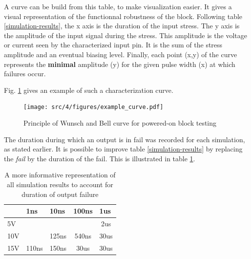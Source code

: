 A curve can be build from this table, to make visualization easier.
It gives a visual representation of the functionnal robustness of the block.
Following table \ref{simulation-results}, the x axis is the duration of the input stress.
The y axis is the amplitude of the input signal during the stress.
This amplitude is the voltage or current seen by the characterized input pin.
It is the sum of the stress amplitude and an eventual biasing level.
Finally, each point (x,y) of the curve represents the \textbf{minimal} amplitude (y) for the given pulse width (x) at which failures occur.

Fig. \ref{wb_cz_curve_example} gives an example of such a characterization curve.

\begin{figure}[!htbp]
  \centering
  \texttt{[image: src/4/figures/example\_curve.pdf]}
  \caption{Principle of Wunsch and Bell curve for powered-on block testing}
  \label{wb_cz_curve_example}
\end{figure}

The duration during which an output is in fail was recorded for each simulation, as stated earlier.
It is possible to improve table \ref{simulation-results} by replacing the \textit{fail} by the duration of the fail.
This is illustrated in table \ref{simulation-results-bis}.

\begin{table}[!htbp]
\centering
\begin{tabular}{@{}lcccc@{}}
\toprule
    & \multicolumn{1}{l}{1ns}      & \multicolumn{1}{l}{10ns}     & \multicolumn{1}{l}{100ns}    & \multicolumn{1}{l}{1us}     \\ \midrule
5V  & {\color[HTML]{32CB00} }      & {\color[HTML]{32CB00} }      & {\color[HTML]{32CB00} }      & {\color[HTML]{F56B00} 2us}  \\
10V & {\color[HTML]{32CB00} }      & {\color[HTML]{00D2CB} 125ns} & {\color[HTML]{F8A102} 540ns} & {\color[HTML]{FE0000} 30us} \\
15V & {\color[HTML]{00D2CB} 110ns} & {\color[HTML]{FFCB2F} 150ns} & {\color[HTML]{FE0000} 30us}  & {\color[HTML]{FE0000} 30us} \\ \bottomrule
\end{tabular}
\caption{A more informative representation of all simulation results to account for duration of output failure}
\label{simulation-results-bis}
\end{table}

